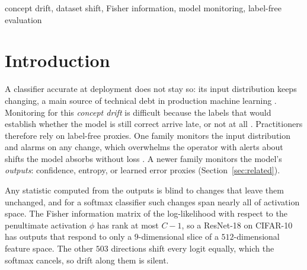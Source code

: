 \documentclass[conference]{IEEEtran}
\newcommand{\act}{\phi}
\begin{document}
\begin{IEEEkeywords}
concept drift, dataset shift, Fisher information, model monitoring,
label-free evaluation
\end{IEEEkeywords}

\section{Introduction}
\label{sec:intro}

A classifier accurate at deployment does not stay so: its input distribution
keeps changing, a main source of technical debt in production machine learning
\cite{sculley2015debt}. Monitoring for this \emph{concept drift} is difficult
because the labels that would establish whether the model is still correct
arrive late, or not at all \cite{gama2014survey, lu2018learning}.
Practitioners therefore rely on label-free proxies. One family monitors the
input distribution and alarms on any change, which overwhelms the operator
with alerts about shifts the model absorbs without loss
\cite{rabanser2019failing}. A newer family monitors the model's
\emph{outputs}: confidence, entropy, or learned error proxies
(Section~\ref{sec:related}).

Any statistic computed from the outputs is blind to changes that leave them
unchanged, and for a softmax classifier such changes span nearly all of
activation space. The Fisher information matrix of the log-likelihood with
respect to the penultimate activation $\act$ has rank at most $C-1$, so a
ResNet-18 on CIFAR-10 has outputs that respond to only a $9$-dimensional slice
of a $512$-dimensional feature space. The other $503$ directions shift every
logit equally, which the softmax cancels, so drift along them is silent.
\end{document}
